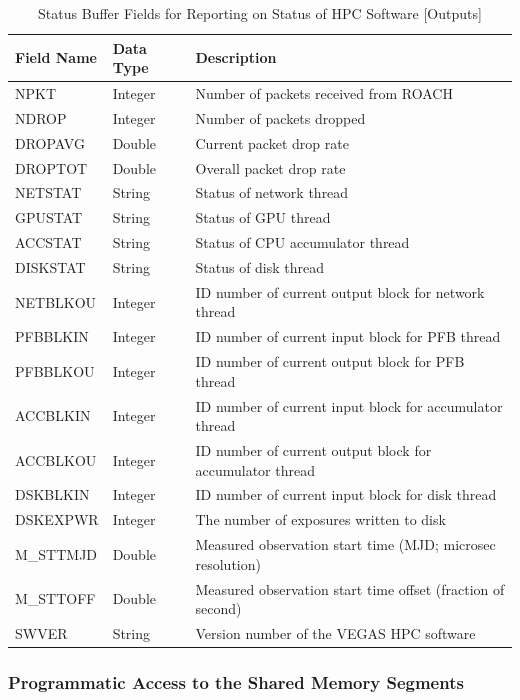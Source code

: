 \documentclass[11pt]{article} %
\begin{document}
\begin{table}[!h]
\centering
\caption{Status Buffer Fields for Reporting on Status of HPC Software [Outputs]}
\begin{tabular}{l l l}
\hline
\bf Field Name & \bf Data Type & \bf Description \\
\hline
NPKT & Integer & Number of packets received from ROACH \\ 
NDROP & Integer & Number of packets dropped \\ 
DROPAVG & Double & Current packet drop rate \\ 
DROPTOT & Double & Overall packet drop rate \\
NETSTAT & String & Status of network thread \\
GPUSTAT & String & Status of GPU thread \\
ACCSTAT & String & Status of CPU accumulator thread \\
DISKSTAT & String & Status of disk thread \\
NETBLKOU & Integer & ID number of current output block for network thread \\ 
PFBBLKIN & Integer & ID number of current input block for PFB thread \\ 
PFBBLKOU & Integer & ID number of current output block for PFB thread\\ 
ACCBLKIN & Integer & ID number of current input block for accumulator thread\\ 
ACCBLKOU & Integer & ID number of current output block for accumulator thread\\ 
DSKBLKIN & Integer & ID number of current input block for disk thread \\
DSKEXPWR & Integer & The number of exposures written to disk \\ 
M\_STTMJD & Double & Measured observation start time (MJD; microsec resolution)\\
M\_STTOFF & Double & Measured observation start time offset (fraction of second) \\
SWVER & String & Version number of the VEGAS HPC software \\
\hline
\end{tabular}
\label{status-buffer-monitor}
\end{table}

\subsubsection{Programmatic Access to the Shared Memory Segments}
\end{document}
